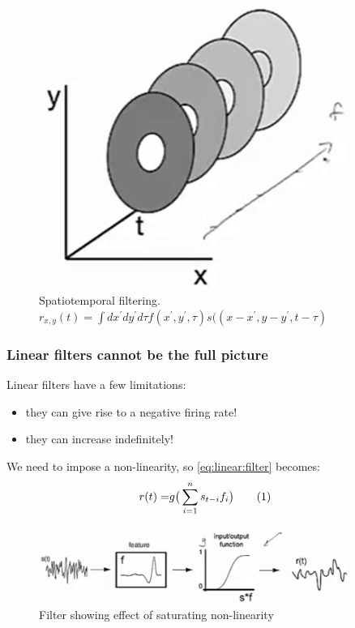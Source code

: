 \documentclass[]{article}
\newcommand\numberthis{\addtocounter{equation}{1}\tag{\theequation}}
\begin{document}
\begin{figure}[H]
	\caption[Spatiotemporal filtering]{Spatiotemporal filtering. $r_{x,y}(t)=\int dx^\prime dy^\prime d\tau f(x^\prime,y^\prime,\tau) s((x-x^\prime,y-y^\prime,t-\tau)$}
	\includegraphics[width=0.9\textwidth]{spatio--temporal-filtering}
\end{figure}

\subsubsection{Linear filters cannot be the full picture}

Linear filters have a few limitations:
\begin{itemize}
	\item they can give rise to a negative firing rate!
	\item they can increase indefinitely!
\end{itemize} 

We need to impose a non-linearity, so \eqref{eq:linear:filter} becomes:
\begin{align*}
	r(t) =& g\big(\sum_{i=1}^{n} s_{t-i} f_i\big) \numberthis \label{eq:non-linearity}
\end{align*}

\begin{figure}[H]
	\caption{Filter showing effect of saturating non-linearity}
	\includegraphics[width=0.9\textwidth]{saturated}
\end{figure}
\end{document}
